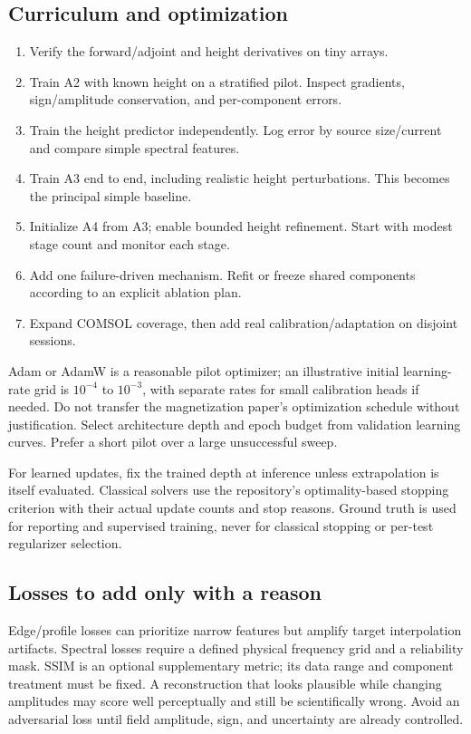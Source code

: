 \subsection{Curriculum and optimization}
\begin{enumerate}
\item Verify the forward/adjoint and height derivatives on tiny arrays.
\item Train A2 with known height on a stratified pilot. Inspect gradients, sign/amplitude conservation, and per-component errors.
\item Train the height predictor independently. Log error by source size/current and compare simple spectral features.
\item Train A3 end to end, including realistic height perturbations. This becomes the principal simple baseline.
\item Initialize A4 from A3; enable bounded height refinement. Start with modest stage count and monitor each stage.
\item Add one failure-driven mechanism. Refit or freeze shared components according to an explicit ablation plan.
\item Expand COMSOL coverage, then add real calibration/adaptation on disjoint sessions.
\end{enumerate}
Adam or AdamW is a reasonable pilot optimizer; an illustrative initial learning-rate grid is $10^{-4}$ to $10^{-3}$, with separate rates for small calibration heads if needed. Do not transfer the magnetization paper's optimization schedule without justification. Select architecture depth and epoch budget from validation learning curves. Prefer a short pilot over a large unsuccessful sweep.

For learned updates, fix the trained depth at inference unless extrapolation is itself evaluated. Classical solvers use the repository's optimality-based stopping criterion with their actual update counts and stop reasons. Ground truth is used for reporting and supervised training, never for classical stopping or per-test regularizer selection.

\subsection{Losses to add only with a reason}
Edge/profile losses can prioritize narrow features but amplify target interpolation artifacts. Spectral losses require a defined physical frequency grid and a reliability mask. SSIM is an optional supplementary metric; its data range and component treatment must be fixed. A reconstruction that looks plausible while changing amplitudes may score well perceptually and still be scientifically wrong. Avoid an adversarial loss until field amplitude, sign, and uncertainty are already controlled.

